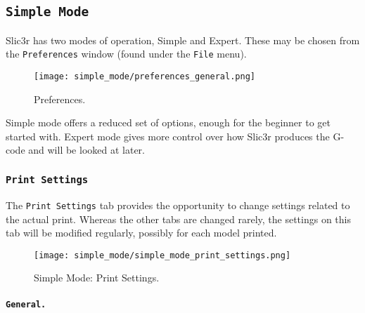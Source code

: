 \subsection{\texttt{Simple Mode}} %
\label{sec:simple_mode}

Slic3r has two modes of operation, Simple and Expert. These may be chosen from the \texttt{Preferences} window (found under the \texttt{File} menu).

\begin{figure}[ht]
\centering
\texttt{[image: simple\_mode/preferences\_general.png]}
\caption{Preferences.}
\label{fig:preferences_general}
\end{figure}

Simple mode offers a reduced set of options, enough for the beginner to get started with.  Expert mode gives more control over how Slic3r produces the G-code and will be looked at later.

\subsubsection{\texttt{Print Settings}}

The \texttt{Print Settings} tab provides the opportunity to change settings related to the actual print.  Whereas the other tabs are changed rarely, the settings on this tab will be modified regularly, possibly for each model printed.

\begin{figure}[ht]
\centering
\texttt{[image: simple\_mode/simple\_mode\_print\_settings.png]}
\caption{Simple Mode: Print Settings.}
\label{fig:simple_mode_print_settings}
\end{figure}

\paragraph{\texttt{General.}} %
\label{par:simple_general}

